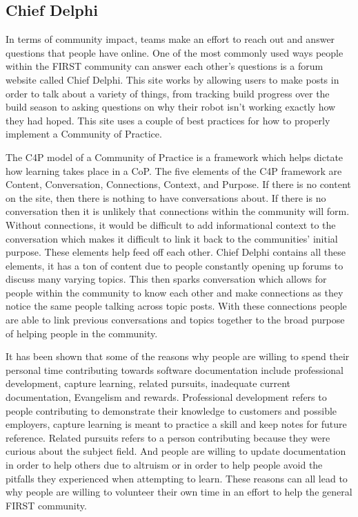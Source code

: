 \documentclass[10pt,twocolumn]{article}
\begin{document}
\subsection{Chief Delphi}

In terms of community impact, teams make an effort to reach out and answer questions that people have online. One of the most commonly used ways people within the FIRST community can answer each other's questions is a forum website called Chief Delphi. This site works by allowing users to make posts in order to talk about a variety of things, from tracking build progress over the build season to asking questions on why their robot isn't working exactly how they had hoped. This site uses a couple of best practices for how to properly implement a Community of Practice. 

The C4P model of a Community of Practice is a framework which helps dictate how learning takes place in a CoP\cite{hoadley_using_2005}. The five elements of the C4P framework are Content, Conversation, Connections, Context, and Purpose. If there is no content on the site, then there is nothing to have conversations about. If there is no conversation then it is unlikely that connections within the community will form. Without connections, it would be difficult to add informational context to the conversation which makes it difficult to link it back to the communities' initial purpose. These elements help feed off each other. Chief Delphi contains all these elements, it has a ton of content due to people constantly opening up forums to discuss many varying topics. This then sparks conversation which allows for people within the community to know each other and make connections as they notice the same people talking across topic posts. With these connections people are able to link previous conversations and topics together to the broad purpose of helping people in the community. 

It has been shown that some of the reasons why people are willing to spend their personal time contributing towards software documentation include professional development, capture learning, related pursuits, inadequate current documentation, Evangelism and rewards\cite{arya_why_2024}. Professional development refers to people contributing to demonstrate their knowledge to customers and possible employers, capture learning is meant to practice a skill and keep notes for future reference. Related pursuits refers to a person contributing because they were curious about the subject field. And people are willing to update documentation in order to help others due to altruism or in order to help people avoid the pitfalls they experienced when attempting to learn\cite{arya_why_2024}. These reasons can all lead to why people are willing to volunteer their own time in an effort to help the general FIRST community.
\end{document}
